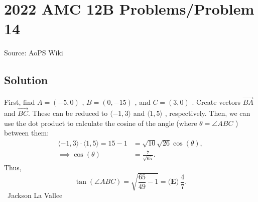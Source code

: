 \documentclass[12pt]{article}
\begin{document}
\section*{{2022 AMC 12B Problems/Problem 14}}
Source: AoPS Wiki

\subsection*{Solution}
First, find $A=(-5,0)$ , $B=(0,-15)$ , and $C=(3,0)$ . Create vectors $\overrightarrow{BA}$ and $\overrightarrow{BC}.$ These can be reduced to $\langle -1, 3 \rangle$ and $\langle 1, 5 \rangle$ , respectively. Then, we can use the dot product to calculate the cosine of the angle (where $\theta=\angle ABC$ ) between them: \begin{align*} \langle -1, 3 \rangle \cdot \langle 1, 5 \rangle = 15-1 &= \sqrt{10}\sqrt{26}\cos(\theta),\\ \implies \cos (\theta) &= \frac{7}{\sqrt{65}}. \end{align*} Thus, \[\tan(\angle ABC) = \sqrt{\frac{65}{49}-1}= \boxed{\textbf{(E)}\ \frac{4}{7}}.\] ~Jackson La Vallee
\end{document}
